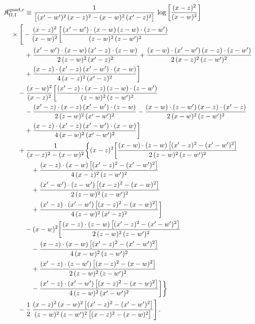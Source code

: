 \begin{align}\label{eq:K-rm_quad_c_rm_II_I}
&\mathfrak{K}^{{\rm quad},c}_{\rm II.I}\equiv \frac{1}{\big[(x'-w')^{2}\,(x-z)^{2}-(x-w)^{2}\,(x'-z)^{2}\big]}\, \log\left[\frac{(x-z)^{2}}{(x-w)^{2}}\right]\notag\\
&\quad \times\Bigg[-\frac{(x-z)^{2}}{(x-w)^{2}}\bigg[\frac{(x'-w')\cdot(x-w)\,(z-w)\cdot(z-w')}{(z-w)^{2}\,(z-w')^{2}}\notag\\
&\quad\quad\quad +\frac{(x'-w')\cdot(x-w)\,(x'-z)\cdot(z-w)}{2\,(z-w)^{2}\,(x'-z)^{2}} +\frac{(x-w)\cdot(x'-w')\,(x-z)\cdot(z-w')}{2\,(x-z)^{2}\,(z-w')^{2}}\notag\\
&\quad\quad\quad +\frac{(x-z)\cdot(x'-z)\,(x'-w')\cdot(x-w)}{4\,(x-z)^{2}\,(x'-z)^{2}}\bigg]\notag\\
&\quad\quad -\frac{(x-w)^{2}}{(x-z)^{2}}\bigg[\frac{(x'-z)\cdot(x-z)\,(z-w)\cdot(z-w')}{(z-w)^{2}\,(z-w')^{2}}\notag\\
&\quad\quad\quad -\frac{(x'-z)\cdot(x-z)\,(x'-w')\cdot(z-w)}{2\,(z-w)^{2}\,(x'-w')^{2}} -\frac{(x-w)\cdot(z-w')\,(x-z)\cdot(x'-z)}{2\,(x-w)^{2}\,(z-w')^{2}}\notag\\
&\quad\quad\quad +\frac{(x-z)\cdot(x'-z)\,(x'-w')\cdot(x-w)}{4\,(x-w)^{2}\,(x'-w')^{2}}\bigg]\notag\\
&\quad\quad +\frac{1}{(x-z)^{2}-(x-w)^{2}}\bigg\{(x-z)^{2}\bigg[\frac{(x-w)\cdot(z-w)\,\big[(x'-z)^{2}-(x'-w')^{2}\big]}{2\,(z-w)^{2}\,(z-w')^{2}}\notag\\
&\quad\quad\quad\quad +\frac{(x-z)\cdot(x-w)\,\big[(x'-z)^{2}-(x'-w')^{2}\big]}{4\,(x-z)^{2}\,(z-w')^{2}}\notag\\
&\quad\quad\quad\quad +\frac{(x'-w')\cdot(z-w')\,\big[(x-z)^{2}-(x-w)^{2}\big]}{2\,(z-w)^{2}\,(z-w')^{2}}\notag\\
&\quad\quad\quad\quad +\frac{(x'-z)\cdot(x'-w')\,\big[(x-z)^{2}-(x-w)^{2}\big]}{4\,(z-w)^{2}\,(x'-z)^{2}}\bigg]\notag\\
&\quad\quad\quad -(x-w)^{2}\bigg[\frac{(x-z)\cdot(z-w)\,\big[(x'-z)^{2}-(x'-w')^{2}\big]}{2\,(z-w)^{2}\,(z-w')^{2}}\notag\\
&\quad\quad\quad\quad -\frac{(x-z)\cdot(x-w)\,\big[(x'-z)^{2}-(x'-w')^{2}\big]}{4\,(x-w)^{2}\,(z-w')^{2}}\notag\\
&\quad\quad\quad\quad +\frac{(x'-z)\cdot(z-w')\,\big[(x-z)^{2}-(x-w)^{2}\big]}{2\,(z-w)^{2}\,(z-w')^{2}}\notag\\
&\quad\quad\quad\quad -\frac{(x'-z)\cdot(x'-w')\,\big[(x-z)^{2}-(x-w)^{2}\big]}{4\,(z-w)^{2}\,(x'-w')^{2}}\bigg]\bigg\}\notag\\
&\quad\quad -\frac{1}{2}\, \frac{(x-z)^{2}\,(x-w)^{2}\,\big[(x'-z)^{2}-(x'-w')^{2}\big]}{(z-w)^{2}\,(z-w')^{2}\,\big[(x-z)^{2}-(x-w)^{2}\big]}\Bigg]\,.
\end{align}
